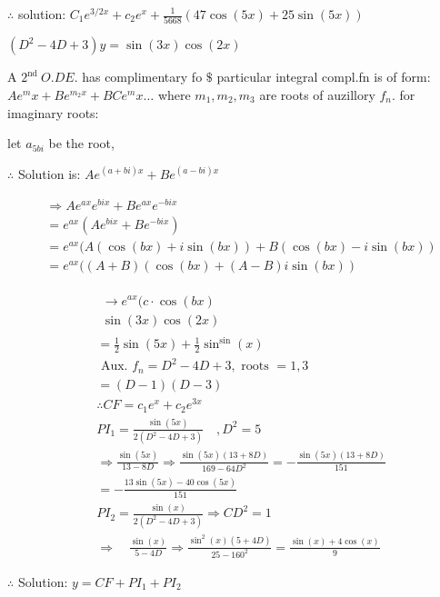 \documentclass[12pt, a4paper]{article}
\begin{document}
$\therefore$ solution: $C_{1} e^{3 / 2 x}+c_{2} e^{x}+\frac{1}{5668}(47 \cos (5 x)+25 \sin (5 x))$

$\left(D^{2}-4 D+3\right) y=\sin (3 x) \cos (2 x)$

A $2^{\text {nd }} O . D E$. has complimentary fo $\$$ particular integral compl.fn is of form: $A e^{m} x+B e^{m_{2} x}+B C e^{m} x \ldots$ where $m_{1}, m_{2}, m_{3}$ are roots of auzillory $f_{n}$. for imaginary roots:

let $a_{5 b i}$ be the root,

$\therefore$ Solution is: $A e^{(a+b i) x}+B e^{(a-b i) x}$

$$
\begin{aligned}
& \Rightarrow A e^{a x} e^{b i x}+B e^{a x} e^{-b i x} \\
& =e^{a x}\left(A e^{b i x}+B e^{-b i x}\right) \\
& =e^{a x}(A(\cos (b x)+i \sin (b x))+B(\cos (b x)-i \sin (b x)) \\
& =e^{a x}((A+B)(\cos (b x)+(A-B) i \sin (b x))
\end{aligned}
$$

$$
\begin{aligned}
& \begin{array}{l}
\rightarrow e^{a x}(c \cdot \cos (b x) \\
\sin (3 x) \cos (2 x)
\end{array} \\
& =\frac{1}{2} \sin (5 x)+\frac{1}{2} \sin ^{\sin }(x) \\
& \text { Aux. } f_{n}=D^{2}-4 D+3, \text { roots }=1,3 \\
& =(D-1)(D-3) \\
& \therefore C F=c_{1} e^{x}+c_{2} e^{3 x} \\
& P I_{1}=\frac{\sin (5 x)}{2\left(D^{2}-4 D+3\right)} \quad, D^{2}=5 \\
& \Rightarrow \frac{\sin (5 x)}{13-8 D} \Rightarrow \frac{\sin (5 x)(13+8 D)}{169-64 D^{2}}=-\frac{\sin (5 x)(13+8 D)}{151} \\
& =-\frac{13 \sin (5 x)-40 \cos (5 x)}{151} \\
& P I_{2}=\frac{\sin (x)}{2\left(D^{2}-4 D+3\right)} \Rightarrow C D^{2}=1 \\
& \Rightarrow \quad \frac{\sin (x)}{5-4 D} \Rightarrow \frac{\sin ^{2}(x)(5+4 D)}{25-160^{2}}=\frac{\sin (x)+4 \cos (x)}{9}
\end{aligned}
$$

$\therefore$ Solution: $y=C F+P I_{1}+P I_{2}$
\end{document}
